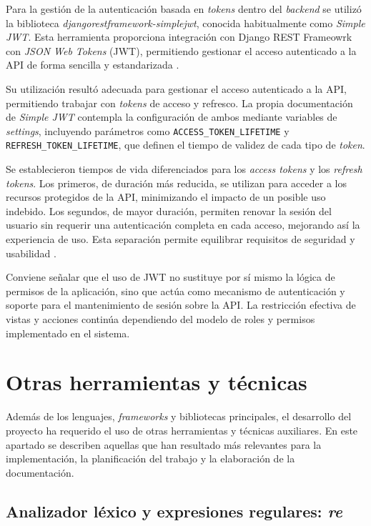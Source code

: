 Para la gestión de la autenticación basada en \textit{tokens} dentro del \textit{backend} se utilizó la biblioteca \textit{djangorestframework-simplejwt}, conocida habitualmente como \textit{Simple JWT}. Esta herramienta proporciona integración con Django REST Frameowrk con \textit{JSON Web Tokens} (JWT), permitiendo gestionar el acceso autenticado a la API de forma sencilla y estandarizada \cite{simplejwt_docs}.

Su utilización resultó adecuada para gestionar el acceso autenticado a la API, permitiendo trabajar con \textit{tokens} de acceso y refresco. La propia documentación de \textit{Simple JWT} contempla la configuración de ambos mediante variables de \textit{settings}, incluyendo parámetros como \texttt{ACCESS\_TOKEN\_LIFETIME} y \texttt{REFRESH\_TOKEN\_LIFETIME}, que definen el tiempo de validez de cada tipo de \textit{token}.

Se establecieron tiempos de vida diferenciados para los \textit{access tokens} y los \textit{refresh tokens}. Los primeros, de duración más reducida, se utilizan para acceder a los recursos protegidos de la API, minimizando el impacto de un posible uso indebido. Los segundos, de mayor duración, permiten renovar la sesión del usuario sin requerir una autenticación completa en cada acceso, mejorando así la experiencia de uso. Esta separación permite equilibrar requisitos de seguridad y usabilidad \cite{simplejwt_settings}.

Conviene señalar que el uso de JWT no sustituye por sí mismo la lógica de permisos de la aplicación, sino que actúa como mecanismo de autenticación y soporte para el mantenimiento de sesión sobre la API. La restricción efectiva de vistas y acciones continúa dependiendo del modelo de roles y permisos implementado en el sistema.

\section{Otras herramientas y técnicas}

Además de los lenguajes, \textit{frameworks} y bibliotecas principales, el desarrollo del proyecto ha requerido el uso de otras herramientas y técnicas auxiliares. En este apartado se describen aquellas que han resultado más relevantes para la implementación, la planificación del trabajo y la elaboración de la documentación.

\subsection{Analizador léxico y expresiones regulares: \textit{re}}

